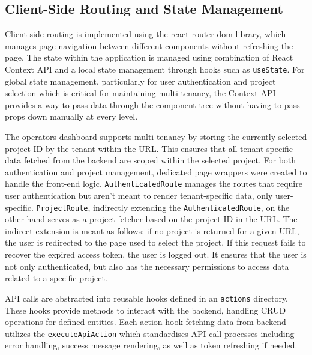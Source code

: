 \subsection{Client-Side Routing and State Management}
\label{subsec:client-side-routing-state}
Client-side routing is implemented using the \gls{react-router-dom} library, which manages page navigation between different components without refreshing the page. 
The state within the application is managed using combination of React Context API and a local state management through hooks such as \texttt{useState}.
For global state management, particularly for user authentication and project selection which is critical for maintaining multi-tenancy, the Context API provides a way to pass data through the component tree without having to pass props down manually at every level.

The operators dashboard supports multi-tenancy by storing the currently selected project ID by the tenant within the URL.
This ensures that all tenant-specific data fetched from the backend are scoped within the selected project.
For both authentication and project management, dedicated page wrappers were created to handle the front-end logic.
\texttt{AuthenticatedRoute} manages the routes that require user authentication but aren't meant to render tenant-specific data, only user-specific.
\texttt{ProjectRoute}, indirectly extending the \texttt{AuthenticatedRoute}, on the other hand serves as a project fetcher based on the project ID in the URL.
The indirect extension is meant as follows: if no project is returned for a given URL, the user is redirected to the page used to select the project. If this request fails to recover the expired access token, the user is logged out.
It ensures that the user is not only authenticated, but also has the necessary permissions to access data related to a specific project.



API calls are abstracted into reusable hooks defined in an \texttt{actions} directory.
These hooks provide methods to interact with the backend, handling CRUD operations for defined entities.
Each action hook fetching data from backend utilizes the \texttt{executeApiAction} which standardises API call processes including error handling, success message rendering, as well as token refreshing if needed.

